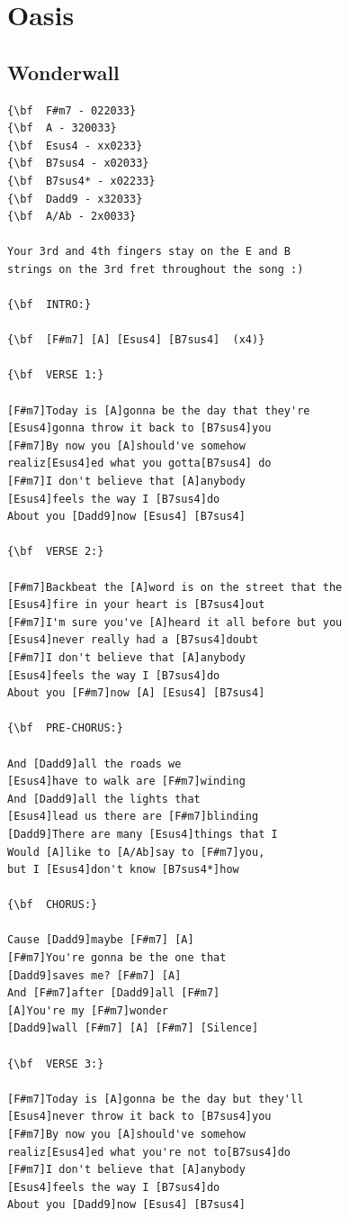 \documentclass[a4paper]{article}
\begin{document}
\section{Oasis}
\subsection{Wonderwall}
\begin{Verbatim}[commandchars=\\\{\}]
{\bf  F#m7 - 022033}
{\bf  A - 320033}
{\bf  Esus4 - xx0233}
{\bf  B7sus4 - x02033}
{\bf  B7sus4* - x02233}
{\bf  Dadd9 - x32033}
{\bf  A/Ab - 2x0033}

Your 3rd and 4th fingers stay on the E and B 
strings on the 3rd fret throughout the song :)

{\bf  INTRO:}

{\bf  [F#m7] [A] [Esus4] [B7sus4]  (x4)}

{\bf  VERSE 1:}

[F#m7]Today is [A]gonna be the day that they're 
[Esus4]gonna throw it back to [B7sus4]you
[F#m7]By now you [A]should've somehow 
realiz[Esus4]ed what you gotta[B7sus4] do
[F#m7]I don't believe that [A]anybody 
[Esus4]feels the way I [B7sus4]do 
About you [Dadd9]now [Esus4] [B7sus4]

{\bf  VERSE 2:}

[F#m7]Backbeat the [A]word is on the street that the 
[Esus4]fire in your heart is [B7sus4]out
[F#m7]I'm sure you've [A]heard it all before but you 
[Esus4]never really had a [B7sus4]doubt
[F#m7]I don't believe that [A]anybody 
[Esus4]feels the way I [B7sus4]do
About you [F#m7]now [A] [Esus4] [B7sus4]

{\bf  PRE-CHORUS:}

And [Dadd9]all the roads we 
[Esus4]have to walk are [F#m7]winding
And [Dadd9]all the lights that 
[Esus4]lead us there are [F#m7]blinding
[Dadd9]There are many [Esus4]things that I 
Would [A]like to [A/Ab]say to [F#m7]you, 
but I [Esus4]don't know [B7sus4*]how

{\bf  CHORUS:}

Cause [Dadd9]maybe [F#m7] [A]
[F#m7]You're gonna be the one that 
[Dadd9]saves me? [F#m7] [A]
And [F#m7]after [Dadd9]all [F#m7]
[A]You're my [F#m7]wonder
[Dadd9]wall [F#m7] [A] [F#m7] [Silence]

{\bf  VERSE 3:}

[F#m7]Today is [A]gonna be the day but they'll 
[Esus4]never throw it back to [B7sus4]you
[F#m7]By now you [A]should've somehow 
realiz[Esus4]ed what you're not to[B7sus4]do
[F#m7]I don't believe that [A]anybody 
[Esus4]feels the way I [B7sus4]do 
About you [Dadd9]now [Esus4] [B7sus4]


\end{Verbatim}
\end{document}

